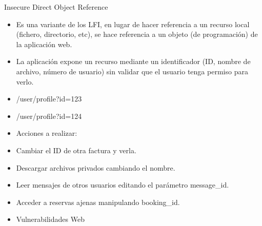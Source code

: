 \documentclass[aspectratio=169,10pt]{beamer}
\begin{document}
\begin{frame}[allowframebreaks]{Insecure Direct Object Reference}
\small
  \begin{itemize}
  \item Es una variante de los LFI, en lugar de hacer referencia a un recurso local (fichero, directorio, etc), se hace referencia a un objeto (de programación) de la aplicación web.
  \item La aplicación expone un recurso mediante un identificador (ID, nombre de archivo, número de usuario) sin validar que el usuario tenga permiso para verlo.
  \item /user/profile?id=123
  \item /user/profile?id=124
  \item Acciones a realizar:
  \item Cambiar el ID de otra factura y verla.
  \item Descargar archivos privados cambiando el nombre.
  \item Leer mensajes de otros usuarios editando el parámetro message\_id.
  \item Acceder a reservas ajenas manipulando booking\_id.
  \item Vulnerabilidades Web
  \end{itemize}
\end{frame}
\end{document}
